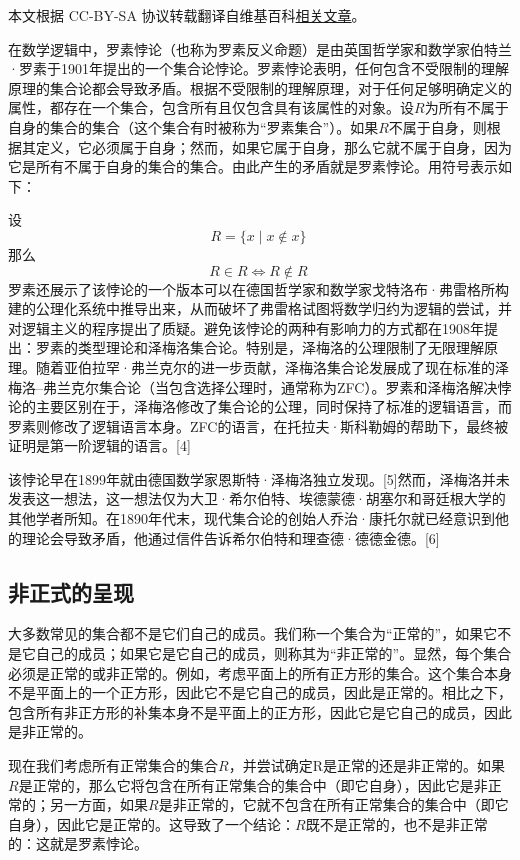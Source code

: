 
本文根据 CC-BY-SA 协议转载翻译自维基百科\href{https://en.wikipedia.org/wiki/Russell\%27s_paradox}{相关文章}。

在数学逻辑中，罗素悖论（也称为罗素反义命题）是由英国哲学家和数学家伯特兰·罗素于1901年提出的一个集合论悖论。罗素悖论表明，任何包含不受限制的理解原理的集合论都会导致矛盾。根据不受限制的理解原理，对于任何足够明确定义的属性，都存在一个集合，包含所有且仅包含具有该属性的对象。设\(R\)为所有不属于自身的集合的集合（这个集合有时被称为“罗素集合”）。如果\(R\)不属于自身，则根据其定义，它必须属于自身；然而，如果它属于自身，那么它就不属于自身，因为它是所有不属于自身的集合的集合。由此产生的矛盾就是罗素悖论。用符号表示如下：

设 
\[
R = \{ x \mid x \notin x \}~
\]
那么
\[
R \in R \iff R \notin R~
\]
罗素还展示了该悖论的一个版本可以在德国哲学家和数学家戈特洛布·弗雷格所构建的公理化系统中推导出来，从而破坏了弗雷格试图将数学归约为逻辑的尝试，并对逻辑主义的程序提出了质疑。避免该悖论的两种有影响力的方式都在1908年提出：罗素的类型理论和泽梅洛集合论。特别是，泽梅洛的公理限制了无限理解原理。随着亚伯拉罕·弗兰克尔的进一步贡献，泽梅洛集合论发展成了现在标准的泽梅洛–弗兰克尔集合论（当包含选择公理时，通常称为ZFC）。罗素和泽梅洛解决悖论的主要区别在于，泽梅洛修改了集合论的公理，同时保持了标准的逻辑语言，而罗素则修改了逻辑语言本身。ZFC的语言，在托拉夫·斯科勒姆的帮助下，最终被证明是第一阶逻辑的语言。[4]

该悖论早在1899年就由德国数学家恩斯特·泽梅洛独立发现。[5]然而，泽梅洛并未发表这一想法，这一想法仅为大卫·希尔伯特、埃德蒙德·胡塞尔和哥廷根大学的其他学者所知。在1890年代末，现代集合论的创始人乔治·康托尔就已经意识到他的理论会导致矛盾，他通过信件告诉希尔伯特和理查德·德德金德。[6]
\subsection{非正式的呈现}  
大多数常见的集合都不是它们自己的成员。我们称一个集合为“正常的”，如果它不是它自己的成员；如果它是它自己的成员，则称其为“非正常的”。显然，每个集合必须是正常的或非正常的。例如，考虑平面上的所有正方形的集合。这个集合本身不是平面上的一个正方形，因此它不是它自己的成员，因此是正常的。相比之下，包含所有非正方形的补集本身不是平面上的正方形，因此它是它自己的成员，因此是非正常的。

现在我们考虑所有正常集合的集合\(R\)，并尝试确定R是正常的还是非正常的。如果\(R\)是正常的，那么它将包含在所有正常集合的集合中（即它自身），因此它是非正常的；另一方面，如果\(R\)是非正常的，它就不包含在所有正常集合的集合中（即它自身），因此它是正常的。这导致了一个结论：\(R\)既不是正常的，也不是非正常的：这就是罗素悖论。

